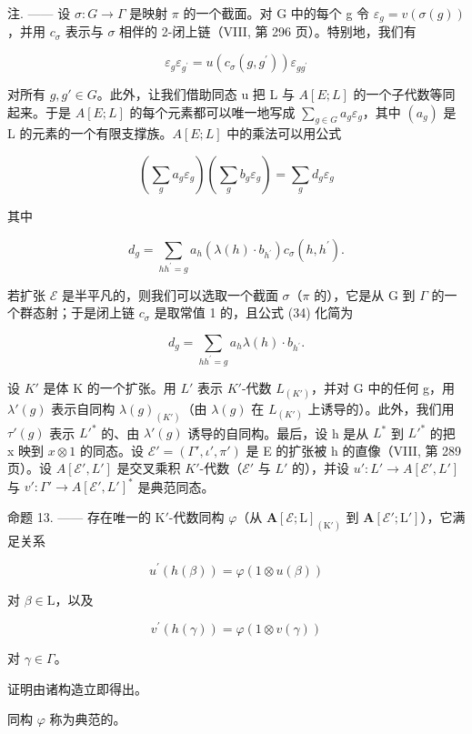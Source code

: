 注. —— 设 \(\sigma: G \to \Gamma\) 是映射 \(\pi\) 的一个截面。对 G 中的每个 g 令 \(\varepsilon_{g} = v(\sigma(g))\)，并用 \(c_{\sigma}\) 表示与 \(\sigma\) 相伴的 2-闭上链（VIII, 第 296 页）。特别地，我们有

\[
\varepsilon_ {g} \varepsilon_ {g ^ {\prime}} = u (c _ {\sigma} (g, g ^ {\prime})) \varepsilon_ {g g ^ {\prime}}\tag{32}
\]

对所有 \(g, g' \in G\)。此外，让我们借助同态 u 把 L 与 \(A[E; L]\) 的一个子代数等同起来。于是 \(A[E; L]\) 的每个元素都可以唯一地写成 \(\sum_{g \in G} a_g \varepsilon_g\)，其中 \((a_g)\) 是 L 的元素的一个有限支撑族。\(A[E; L]\) 中的乘法可以用公式

\[
\left(\sum_ {g} a _ {g} \varepsilon_ {g}\right) \left(\sum_ {g} b _ {g} \varepsilon_ {g}\right) = \sum_ {g} d _ {g} \varepsilon_ {g}\tag{33}
\]

其中

\[
d _ {g} = \sum_ {h h ^ {\prime} = g} a _ {h} (\lambda (h) \cdot b _ {h ^ {\prime}}) c _ {\sigma} (h, h ^ {\prime}).\tag{34}
\]

若扩张 \(\mathcal{E}\) 是半平凡的，则我们可以选取一个截面 \(\sigma\)（\(\pi\) 的），它是从 G 到 \(\Gamma\) 的一个群态射；于是闭上链 \(c_{\sigma}\) 是取常值 1 的，且公式 (34) 化简为

\[
d _ {g} = \sum_ {h h ^ {\prime} = g} a _ {h} \lambda (h) \cdot b _ {h ^ {\prime}}.\tag{35}
\]

设 \(K'\) 是体 K 的一个扩张。用 \(L'\) 表示 \(K'\)-代数 \(L_{(K')}\)，并对 G 中的任何 g，用 \(\lambda'(g)\) 表示自同构 \(\lambda(g)_{(K')}\)（由 \(\lambda(g)\) 在 \(L_{(K')}\) 上诱导的）。此外，我们用 \(\tau'(g)\) 表示 \(L'^*\) 的、由 \(\lambda'(g)\) 诱导的自同构。最后，设 h 是从 \(L^*\) 到 \(L'^*\) 的把 x 映到 \(x \otimes 1\) 的同态。设 \(\mathcal{E}' = (\Gamma', \iota', \pi')\) 是 E 的扩张被 h 的直像（VIII, 第 289 页）。设 \(A[\mathcal{E}', L']\) 是交叉乘积 \(K'\)-代数（\(\mathcal{E}'\) 与 \(L'\) 的），并设 \(u': L' \to A[\mathcal{E}', L']\) 与 \(v': \Gamma' \to A[\mathcal{E}', L']^*\) 是典范同态。

命题 13. —— 存在唯一的 \(\mathrm{K}'\)-代数同构 \(\varphi\)（从 \(\mathbf{A}[\mathcal{E};\mathrm{L}]_{(\mathrm{K}')}\) 到 \(\mathbf{A}[\mathcal{E}';\mathrm{L}']\)），它满足关系

\[
u ^ {\prime} (h (\beta)) = \varphi (1 \otimes u (\beta))\tag{36}
\]

对 \(\beta \in \mathrm{L}\)，以及

\[
v ^ {\prime} (h (\gamma)) = \varphi (1 \otimes v (\gamma))\tag{37}
\]

对 \(\gamma\in\Gamma\)。

证明由诸构造立即得出。

同构 \(\varphi\) 称为典范的。
